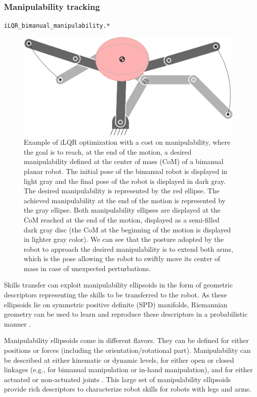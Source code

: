 \documentclass[10pt,a4paper]{article} %
\newcommand{\filename}[1]{\colorbox{rr2}{\color{white}\texttt{#1}}}
\begin{document}
\subsubsection{Manipulability tracking}
\begin{flushright}
\filename{iLQR\_bimanual\_manipulability.*}
\end{flushright}

\begin{figure}
\centering
\includegraphics[width=.4\columnwidth]{images/iLQR_manipulability01.png}
\caption{\footnotesize
Example of iLQR optimization with a cost on manipulability, where the goal is to reach, at the end of the motion, a desired manipulability defined at the center of mass (CoM) of a bimanual planar robot. The initial pose of the bimanual robot is displayed in light gray and the final pose of the robot is displayed in dark gray. The desired manipulability is represented by the red ellipse. The achieved manipulability at the end of the motion is represented by the gray ellipse. Both manipulability ellipses are displayed at the CoM reached at the end of the motion, displayed as a semi-filled dark gray disc (the CoM at the beginning of the motion is displayed in lighter gray color). We can see that the posture adopted by the robot to approach the desired manipulability is to extend both arms, which is the pose allowing the robot to swiftly move its center of mass in case of unexpected perturbations.
}
\label{fig:iLQR_manipulability}
\end{figure}

Skills transfer can exploit manipulability ellipsoids in the form of geometric descriptors representing the skills to be transferred to the robot. As these ellipsoids lie on symmetric positive definite (SPD) manifolds, Riemannian geometry can be used to learn and reproduce these descriptors in a probabilistic manner \cite{Calinon20RAM}.

Manipulability ellipsoids come in different flavors. They can be defined for either positions or forces (including the orientation/rotational part). Manipulability can be described at either kinematic or dynamic levels, for either open or closed linkages (e.g., for bimanual manipulation or in-hand manipulation), and for either actuated or non-actuated joints \cite{Park98}. This large set of manipulability ellipsoids provide rich descriptors to characterize robot skills for robots with legs and arms. 
\end{document}
